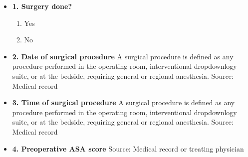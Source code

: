 \documentclass[
]{scrartcl}
\providecommand{\tightlist}{%
  \setlength{\itemsep}{0pt}\setlength{\parskip}{0pt}}\usepackage{longtable,booktabs,array}
\begin{document}
\begin{itemize}
\item
  \textbf{1. Surgery done?}

  \begin{enumerate}
  \def\labelenumi{\arabic{enumi}.}
  \tightlist
  \item
    Yes
  \item
    No
  \end{enumerate}
\item
  \textbf{2. Date of surgical procedure} A surgical procedure is defined
  as any procedure performed in the operating room, interventional
  dropdownlogy suite, or at the bedside, requiring general or regional
  anesthesia. Source: Medical record
\item
  \textbf{3. Time of surgical procedure} A surgical procedure is defined
  as any procedure performed in the operating room, interventional
  dropdownlogy suite, or at the bedside, requiring general or regional
  anesthesia. Source: Medical record
\item
  \textbf{4. Preoperative ASA score} Source: Medical record or treating
  physician


\end{itemize}
\end{document}
